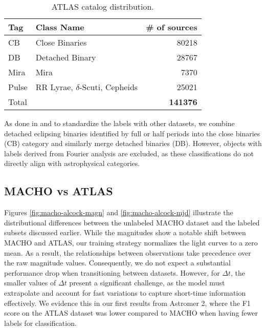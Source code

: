 \begin{table}[h!]
\caption{ATLAS catalog distribution.}              
\label{tab:ATLAS}
\centering 
\begin{tabular}{l l r} 
\hline\hline         
Tag & Class Name & \# of sources \\
\hline
CB & Close Binaries &  \num{80218} \\
DB & Detached Binary &  \num{28767} \\
Mira & Mira &  \num{7370} \\
Pulse &RR Lyrae, $\delta$-Scuti, Cepheids &  \num{25021} \\
Total & & \textbf{\num{141376}}\\
\hline                            
\end{tabular}
\end{table}

As done in \citet{astromer} and to standardize the labels with other datasets, we combine detached eclipsing binaries identified by full or half periods into the close binaries (CB) category and similarly merge detached binaries (DB). However, objects with labels derived from Fourier analysis are excluded, as these classifications do not directly align with astrophysical categories.

\subsection{MACHO vs ATLAS}\label{sec:machovsatlas}
Figures \ref{fig:macho-alcock-magn} and \ref{fig:macho-alcock-mjd} illustrate the distributional differences between the unlabeled MACHO dataset and the labeled subsets discussed earlier. While the magnitudes show a notable shift between MACHO and ATLAS, our training strategy normalizes the light curves to a zero mean. As a result, the relationships between observations take precedence over the raw magnitude values. Consequently, we do not expect a substantial performance drop when transitioning between datasets. However, for $\Delta t$, the smaller values of $\Delta t$ present a significant challenge, as the model must extrapolate and account for fast variations to capture short-time information effectively. We evidence this in our first results from Astromer 2, where the F1 score on the ATLAS dataset was lower compared to MACHO when having fewer labels for classification. 
